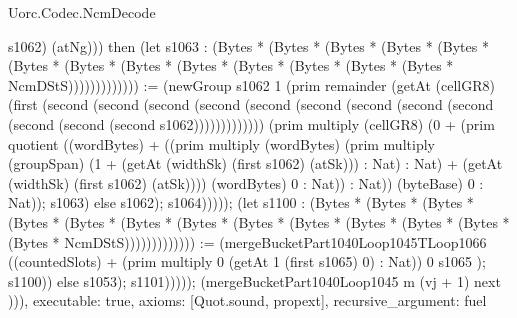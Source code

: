 \begin{lexlean}{Uorc.Codec.NcmDecode}
\begin{semanticmodule}
{s1062) (atNg))) then (let s1063 : (Bytes * (Bytes * (Bytes * (Bytes * (Bytes * (Bytes * (Bytes * (Bytes * (Bytes * (Bytes * (Bytes * (Bytes * (Bytes * NcmDStS))))))))))))) := (newGroup s1062 1 (prim remainder (getAt (cellGR8) (first (second (second (second (second (second (second (second (second (second (second (second (second s1062))))))))))))) (prim multiply (cellGR8) (0 + (prim quotient ((wordBytes) + ((prim multiply (wordBytes) (prim multiply (groupSpan) (1 + (getAt (widthSk) (first s1062) (atSk))) : Nat) : Nat) + (getAt (widthSk) (first s1062) (atSk)))) (wordBytes) 0 : Nat)) : Nat)) (byteBase) 0 : Nat)); s1063) else s1062); s1064))))); (let s1100 : (Bytes * (Bytes * (Bytes * (Bytes * (Bytes * (Bytes * (Bytes * (Bytes * (Bytes * (Bytes * (Bytes * (Bytes * (Bytes * NcmDStS))))))))))))) := (mergeBucketPart1040Loop1045TLoop1066 ((countedSlots) + (prim multiply 0 (getAt 1 (first s1065) 0) : Nat)) 0 s1065 ); s1100)) else s1053); s1101))))); (mergeBucketPart1040Loop1045 m (vj + 1) next ))),
  executable: true,
  axioms: [Quot.sound, propext],
  recursive_argument: fuel
}


\end{semanticmodule}
\end{lexlean}
